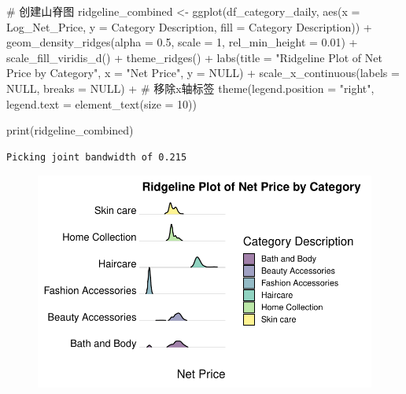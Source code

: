 \documentclass[
  letterpaper,
  DIV=11,
  numbers=noendperiod]{scrartcl}
\newenvironment{Shaded}{\begin{snugshade}}{\end{snugshade}}
\newcommand{\AttributeTok}[1]{\textcolor[rgb]{0.40,0.45,0.13}{#1}}
\newcommand{\CommentTok}[1]{\textcolor[rgb]{0.37,0.37,0.37}{#1}}
\newcommand{\ConstantTok}[1]{\textcolor[rgb]{0.56,0.35,0.01}{#1}}
\newcommand{\DecValTok}[1]{\textcolor[rgb]{0.68,0.00,0.00}{#1}}
\newcommand{\FloatTok}[1]{\textcolor[rgb]{0.68,0.00,0.00}{#1}}
\newcommand{\FunctionTok}[1]{\textcolor[rgb]{0.28,0.35,0.67}{#1}}
\newcommand{\NormalTok}[1]{\textcolor[rgb]{0.00,0.23,0.31}{#1}}
\newcommand{\OtherTok}[1]{\textcolor[rgb]{0.00,0.23,0.31}{#1}}
\newcommand{\SpecialCharTok}[1]{\textcolor[rgb]{0.37,0.37,0.37}{#1}}
\newcommand{\StringTok}[1]{\textcolor[rgb]{0.13,0.47,0.30}{#1}}
\begin{document}
\begin{Shaded}
\begin{Highlighting}[]
\CommentTok{\# 创建山脊图}
\NormalTok{ridgeline\_combined }\OtherTok{\textless{}{-}} \FunctionTok{ggplot}\NormalTok{(df\_category\_daily, }\FunctionTok{aes}\NormalTok{(}\AttributeTok{x =}\NormalTok{ Log\_Net\_Price, }\AttributeTok{y =} \StringTok{\textasciigrave{}}\AttributeTok{Category Description}\StringTok{\textasciigrave{}}\NormalTok{, }\AttributeTok{fill =} \StringTok{\textasciigrave{}}\AttributeTok{Category Description}\StringTok{\textasciigrave{}}\NormalTok{)) }\SpecialCharTok{+}
  \FunctionTok{geom\_density\_ridges}\NormalTok{(}\AttributeTok{alpha =} \FloatTok{0.5}\NormalTok{, }\AttributeTok{scale =} \DecValTok{1}\NormalTok{, }\AttributeTok{rel\_min\_height =} \FloatTok{0.01}\NormalTok{) }\SpecialCharTok{+}
  \FunctionTok{scale\_fill\_viridis\_d}\NormalTok{() }\SpecialCharTok{+}
  \FunctionTok{theme\_ridges}\NormalTok{() }\SpecialCharTok{+}
  \FunctionTok{labs}\NormalTok{(}\AttributeTok{title =} \StringTok{"Ridgeline Plot of Net Price by Category"}\NormalTok{,}
       \AttributeTok{x =} \StringTok{"Net Price"}\NormalTok{, }\AttributeTok{y =} \ConstantTok{NULL}\NormalTok{) }\SpecialCharTok{+}
  \FunctionTok{scale\_x\_continuous}\NormalTok{(}\AttributeTok{labels =} \ConstantTok{NULL}\NormalTok{, }\AttributeTok{breaks =} \ConstantTok{NULL}\NormalTok{) }\SpecialCharTok{+}  \CommentTok{\# 移除x轴标签}
  \FunctionTok{theme}\NormalTok{(}\AttributeTok{legend.position =} \StringTok{"right"}\NormalTok{, }\AttributeTok{legend.text =} \FunctionTok{element\_text}\NormalTok{(}\AttributeTok{size =} \DecValTok{10}\NormalTok{))}

\FunctionTok{print}\NormalTok{(ridgeline\_combined)}
\end{Highlighting}
\end{Shaded}

\begin{verbatim}
Picking joint bandwidth of 0.215
\end{verbatim}

\begin{figure}[H]

{\centering \includegraphics{Time-Serise-EDA_files/figure-pdf/unnamed-chunk-8-1.pdf}

}

\end{figure}
\end{document}
